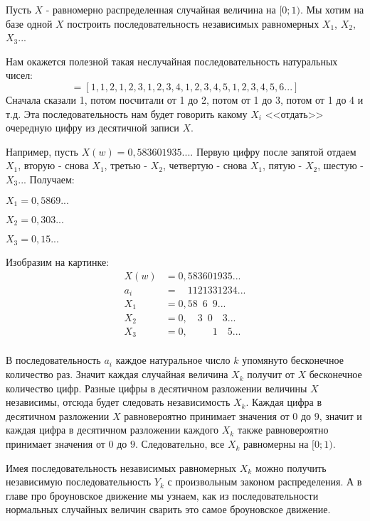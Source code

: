 {Пусть $X$ - равномерно распределенная случайная величина на $[0;1)$. Мы хотим на базе одной $X$ построить последовательность независимых равномерных $X_{1}$, $X_{2}$, $X_{3}$...

Нам окажется полезной такая неслучайная последовательность натуральных чисел:
\begin{equation}
[a_{i}]=[1,1,2,1,2,3,1,2,3,4,1,2,3,4,5,1,2,3,4,5,6...]
\end{equation}
Сначала сказали 1, потом посчитали от 1 до 2, потом от 1 до 3, потом от 1 до 4 и т.д. Эта последовательность нам будет говорить какому $X_{i}$ <<отдать>> очередную цифру из десятичной записи $X$.

Например, пусть $X(w)=0,583601935...$. Первую цифру после запятой отдаем $X_{1}$, вторую - снова $X_{1}$, третью - $X_{2}$, четвертую - снова $X_{1}$, пятую - $X_{2}$, шестую - $X_{3}$... Получаем:

$X_{1}=0,5869...$

$X_{2}=0,303...$

$X_{3}=0,15...$

Изобразим на картинке:
\begin{align*}
X(w) &=0,583601935...\\
a_{i} &=\phantom{0,}1121331234...\\
X_{1}&=0,58\phantom{0}6\phantom{0}9...\\
X_{2}&=0,\phantom{00}3\phantom{0}0\phantom{00}3...\\
X_{3}&=0,\phantom{00000}1\phantom{00}5...\\
\end{align*}



В последовательность $a_{i}$ каждое натуральное число $k$ упомянуто бесконечное количество раз. Значит каждая случайная величина  $X_{k}$ получит от $X$ бесконечное количество цифр. Разные цифры в десятичном разложении величины $X$ независимы, отсюда будет следовать независимость $X_{k}$. Каждая цифра в десятичном разложении $X$ равновероятно принимает значения от $0$ до $9$, значит и каждая цифра в десятичном разложении каждого $X_{k}$ также равновероятно принимает значения от $0$ до $9$. Следовательно, все $X_{k}$ равномерны на $[0;1)$.

Имея последовательность независимых равномерных $X_{k}$ можно получить независимую последовательность $Y_{k}$ с произвольным законом распределения. А в главе про броуновское движение мы узнаем, как из последовательности нормальных случайных величин сварить это самое броуновское движение.

}
